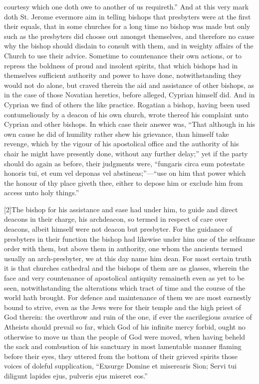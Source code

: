 courtesy which one doth owe to another of us requireth.” And at this very mark doth St. Jerome evermore aim in telling bishops that presbyters were at the first their equals, that in some churches for a long time no bishop was made but only such as the presbyters did choose out amongst themselves, and therefore no cause why the bishop should disdain to consult with them, and in weighty affairs of the Church to use their advice. Sometime to countenance their own actions, or to repress the boldness of proud and insolent spirits, that which bishops had in themselves sufficient authority and power to have done, notwithstanding they would not do alone, but craved therein the aid and assistance of other bishops, as in the case of those Novatian heretics, before alleged, Cyprian himself did. And in Cyprian we find of others the like practice. Rogatian a bishop, having been used contumeliously by a deacon of his own church, wrote thereof his complaint unto Cyprian and other bishops.  In which case their answer was, “That although in his own cause he did of humility rather shew his grievance, than himself take revenge, which by the vigour of his apostolical office and the authority of his chair he might have presently done, without any further delay;” yet if the party should do again as before, their judgments were, “fungaris circa eum potestate honoris tui, et eum vel deponas vel abstineas;”—“use on him that power which the honour of thy place giveth thee, either to depose him or exclude him from access unto holy things.”

[2]The bishop for his assistance and ease had under him, to guide and direct deacons in their charge, his archdeacon, so termed in respect of care over deacons, albeit himself were not deacon but presbyter. For the guidance of presbyters in their function the bishop had likewise under him one of the selfsame order with them, but above them in authority, one whom the ancients termed usually an arch-presbyter, we at this day name him dean. For most certain truth it is that churches cathedral and the bishops of them are as glasses, wherein the face and very countenance of apostolical antiquity remaineth even as yet to be seen, notwithstanding the alterations which tract of time and the course of the world hath brought. For defence and maintenance of them we are most earnestly bound to strive, even as the Jews were for their temple and the high priest of God therein: the overthrow and ruin of the one, if ever the sacrilegious avarice of Atheists should prevail so far, which God of his infinite mercy forbid, ought no otherwise to move us than the people of God were moved, when having beheld the sack and combustion of his sanctuary in most lamentable manner flaming before their eyes, they uttered from the bottom of their grieved spirits those voices of doleful supplication, “Exsurge Domine et miserearis Sion; Servi tui diligunt lapides ejus, pulveris ejus miseret eos.”

